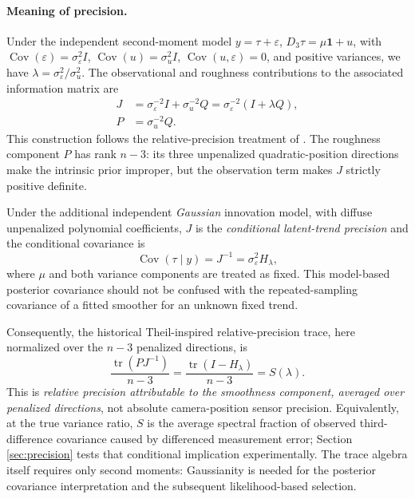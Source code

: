 \paragraph{Meaning of precision.}
Under the independent second-moment model
$y=\tau+\varepsilon$,
$D_3\tau=\mu\mathbf1+u$, with
$\operatorname{Cov}(\varepsilon)=
\sigma_\varepsilon^2 I$,
$\operatorname{Cov}(u)=\sigma_u^2 I$,
$\operatorname{Cov}(u,\varepsilon)=0$,
and positive variances, we have
$\lambda=\sigma_\varepsilon^2/\sigma_u^2$.
The observational and roughness contributions
to the associated information matrix are
\begin{equation}\label{eq:jerk-precision-matrix}
\begin{aligned}
J&=\sigma_\varepsilon^{-2}I+
   \sigma_u^{-2}Q
   =\sigma_\varepsilon^{-2}(I+\lambda Q),\\
P&=\sigma_u^{-2}Q .
\end{aligned}
\end{equation}
This construction follows the relative-precision
treatment of \citet{guerrero2007,cortes2017}.
The roughness component $P$ has rank $n-3$:
its three unpenalized quadratic-position
directions make the intrinsic prior improper,
but the observation term makes $J$
strictly positive definite.

Under the additional independent \emph{Gaussian}
innovation model, with diffuse unpenalized
polynomial coefficients, $J$ is the
\emph{conditional latent-trend precision}
and the conditional covariance is
\begin{equation}\label{eq:jerk-posterior-covariance}
\operatorname{Cov}(\tau\mid y)
=J^{-1}=\sigma_\varepsilon^2H_\lambda,
\end{equation}
where $\mu$ and both variance components
are treated as fixed. This model-based
posterior covariance should not be confused
with the repeated-sampling covariance of a
fitted smoother for an unknown fixed trend.

Consequently, the historical Theil-inspired
relative-precision trace, here normalized
over the $n-3$ penalized directions, is
\begin{equation}\label{eq:relative-precision}
\frac{\operatorname{tr}(PJ^{-1})}{n-3}
=\frac{\operatorname{tr}(I-H_\lambda)}{n-3}
=S(\lambda).
\end{equation}
This is \emph{relative precision attributable
to the smoothness component, averaged over
penalized directions}, not absolute
camera-position sensor precision. Equivalently,
at the true variance ratio, $S$ is the
average spectral fraction of observed
third-difference covariance caused by
differenced measurement error; Section~
\ref{sec:precision} tests that conditional
implication experimentally. The trace
algebra itself requires only second moments:
Gaussianity is needed for the posterior
covariance interpretation and the subsequent
likelihood-based selection.

